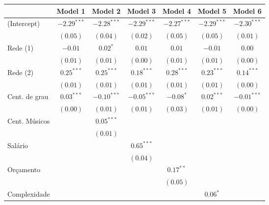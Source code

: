 \documentclass[a4paper, 12pt, openright, oneside, german, french, english, brazil]{abntex2}
\begin{document}
	
	\begin{table}[!ht]
		{\begin{tabular}{l c c c c c c }
			\hline
			 & Model 1 & Model 2 & Model 3 & Model 4 & Model 5 & Model 6 \\
			\hline
			(Intercept)                & $-2.29^{***}$ & $-2.28^{***}$ & $-2.29^{***}$ & $-2.27^{***}$ & $-2.29^{***}$ & $-2.30^{***}$ \\
			& $(0.05)$      & $(0.04)$      & $(0.02)$      & $(0.05)$      & $(0.05)$      & $(0.01)$      \\
			Rede (1)           & $-0.01$       & $0.02^{*}$    & $0.01$        & $0.01$        & $-0.01$       & $0.00$        \\
			& $(0.01)$      & $(0.01)$      & $(0.00)$      & $(0.01)$      & $(0.01)$      & $(0.00)$      \\
			Rede (2)           & $0.25^{***}$  & $0.25^{***}$  & $0.18^{***}$  & $0.28^{***}$  & $0.23^{***}$  & $0.14^{***}$  \\
			& $(0.01)$      & $(0.01)$      & $(0.01)$      & $(0.01)$      & $(0.01)$      & $(0.00)$      \\
			Cent. de grau                  & $0.03^{***}$  & $-0.10^{***}$ & $-0.05^{***}$ & $-0.08^{*}$   & $0.02^{***}$  & $-0.01^{***}$ \\
			& $(0.00)$      & $(0.01)$      & $(0.01)$      & $(0.03)$      & $(0.01)$      & $(0.00)$      \\
			Cent. Músicos &               & $0.05^{***}$  &               &               &               &               \\
			&               & $(0.01)$      &               &               &               &               \\
			Salário          &               &               & $0.65^{***}$  &               &               &               \\
			&               &               & $(0.04)$      &               &               &               \\
			Orçamento        &               &               &               & $0.17^{**}$   &               &               \\
			&               &               &               & $(0.05)$      &               &               \\
			Complexidade     &               &               &               &               & $0.06^{*}$    &               \\

\end{tabular}}
\end{table}
\end{document}
